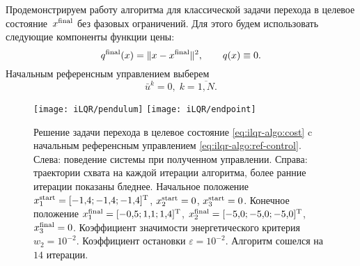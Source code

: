 \documentclass[../../doc.tex]{subfiles}
\begin{document}
    Продемонстрируем работу алгоритма для классической задачи перехода в целевое состояние~$x^{\textnormal{final}}$ без фазовых ограничений.
    Для этого будем использовать следующие компоненты функции цены:
    \begin{equation}\label{eq:ilqr-algo:cost}
        q^{\textnormal{final}}(x) = \|x - x^{\textnormal{final}}\|^2,
        \qquad
        q(x) \equiv 0.
    \end{equation}
    Начальным референсным управлением выберем
    \begin{equation}\label{eq:ilqr-algo:ref-control}
        \bar u^k = 0,\; k = \overline{1, N}.
    \end{equation}

    \begin{figure}[h]
        \begin{center}
            \texttt{[image: iLQR/pendulum]}
            \texttt{[image: iLQR/endpoint]}
        \end{center}
        \caption{
            Решение задачи перехода в целевое состояние \eqref{eq:ilqr-algo:cost} c начальным референсным управлением \eqref{eq:ilqr-algo:ref-control}.
            Слева: поведение системы при полученном управлении. Справа: траектории схвата на каждой итерации алгоритма, более ранние итерации показаны бледнее.
            Начальное положение $x_1^{\textnormal{start}} = [-1,\!4; -1,\!4; -1,\!4]^\textnormal{T}$, $x_2^{\textnormal{start}} = 0$, $x_3^{\textnormal{start}} = 0$.
            Конечное положение $x_1^{\textnormal{final}} = [-0,\!5; 1,\!1; 1,\!4]^\textnormal{T}$, $x_2^{\textnormal{final}} = [ -5,\!0; -5,\!0; -5,\!0]^\textnormal{T}$,  $x_3^{\textnormal{final}} = 0$.
            Коэффициент значимости энергетического критерия $w_2 = 10^{-2}$.
            Коэффициент остановки $\varepsilon = 10^{-2}$.
            Алгоритм сошелся на $14$ итерации.
        }
    \end{figure}

    \ifSubfilesClassLoaded{
        \nocite{*}
        \clearpage
        
        
    }{}
\end{document}
